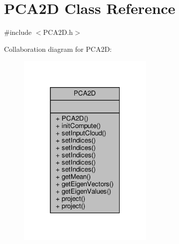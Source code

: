 \hypertarget{classPCA2D}{}\section{P\+C\+A2D Class Reference}
\label{classPCA2D}


{\ttfamily \#include $<$P\+C\+A2\+D.\+h$>$}



Collaboration diagram for P\+C\+A2D\+:\nopagebreak
\begin{figure}[H]
\begin{center}
\leavevmode
\includegraphics[width=184pt]{dc/d8c/classPCA2D__coll__graph}
\end{center}
\end{figure}
